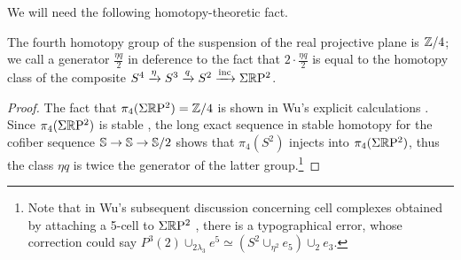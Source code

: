 \documentclass{amsart}
\begin{document}
We will need the following homotopy-theoretic fact.
\begin{proposition}[$\pi_4(\Sigma \RP^2)$]
The fourth homotopy group of the suspension of the real projective plane is $\mathbb Z/4$; we call a generator $\frac{\eta q}{2}$ in deference to the fact that $2 \cdot \frac{\eta q}{2}$ is equal to the homotopy class of the composite $S^4 \xrightarrow{\eta} S^3 \xrightarrow{q} S^2 \xrightarrow{\text{inc}} \Sigma \mathbb R \mathrm{P}^2$.
\end{proposition}
\begin{proof}
The fact that $\pi_4(\Sigma \mathbb R \mathrm{P}^2) = \mathbb Z/4$ is shown in Wu's explicit calculations \cite[Prop.\ 6.5(3)]{wu}. Since $\pi_4(\Sigma \RP^2)$ is stable \cite[Prop 6.14]{wu}, the long exact sequence in stable homotopy for the cofiber sequence $\mathbb S \to \mathbb S \to \mathbb S/2$ shows that $\pi_4(S^2)$ injects into $\pi_4(\Sigma \RP^2)$, thus the class $\eta q$ is twice the generator of the latter group.\footnote{Note that in Wu's subsequent discussion concerning cell complexes obtained by attaching a 5-cell to $\Sigma \mathbb R \mathrm{P}^2$ \cite[Eg.\ 6.15]{wu}, there is a typographical error, whose correction could say $P^3(2) \cup_{2 \lambda_3} e^5 \simeq (S^2 \cup_{\eta^2} e_5) \cup_{2} e_3$.}

\end{proof}

\end{document}
